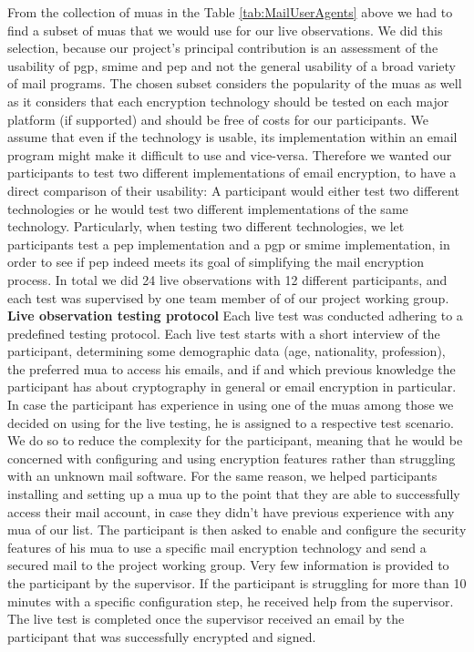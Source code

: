 From the collection of \acrshort{mua}s in the Table \ref{tab:MailUserAgents} above we had to find a subset of \acrshort{mua}s that we would use for our live observations. We did this selection, because our project’s principal contribution is an assessment of the usability of \acrshort{pgp}, \acrshort{smime} and \acrshort{pep} and not the general usability of a broad variety of mail programs. The chosen subset considers the popularity of the \acrshort{mua}s as well as it considers that each encryption technology should be tested on each major platform (if supported) and should be free of costs for our participants. We assume that even if the technology is usable, its implementation within an \acrshort{email} program might make it difficult to use and vice-versa. Therefore we wanted our participants to test two
different implementations of \acrshort{email} encryption, to have a direct comparison of their usability:
\newline
A participant would either test two different technologies or he would test two different implementations of the same technology. Particularly, when testing two different technologies, we let participants test a \acrshort{pep} implementation and a \acrshort{pgp} or \acrshort{smime} implementation, in order to see if \acrshort{pep} indeed meets its goal of simplifying the mail encryption process.
In total we did 24 live observations with 12 different participants, and each test was supervised by one team member of of our project working group.
\newline
\newline
\textbf{Live observation testing protocol}
\newline
Each live test was conducted adhering to a predefined testing protocol. Each live test starts with a short interview of the participant, determining some demographic data (age, nationality, profession), the preferred \acrshort{mua} to access his \acrshort{email}s, and if and which previous knowledge the participant has about cryptography in general or email encryption in particular. In case the participant has experience in using one of the \acrshort{mua}s among those we decided on using for the live testing, he is assigned to a respective test scenario. We do so to reduce the complexity for the participant, meaning that he would be concerned with configuring and using encryption features rather than struggling with an unknown mail software. For the same reason, we helped participants installing and setting up a \acrshort{mua} up to the point that they are able to successfully access their mail account, in case they didn’t have previous experience with any \acrshort{mua} of our list. The participant is then asked to enable and configure the security features of his \acrshort{mua} to use a specific mail encryption technology and send a secured mail to the project working group. Very few information is provided to the participant by the supervisor. If the participant is struggling for more than 10 minutes with a specific configuration step, he received help from the supervisor. The live test is completed once the supervisor received an \acrshort{email} by the participant that was successfully encrypted and signed.